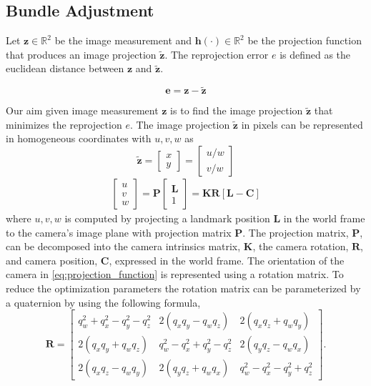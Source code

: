 \documentclass{article}
\renewcommand{\Vec}[1]{{\mathbf{#1}}}
\newcommand{\Mat}[1]{{\mathbf{#1}}}
\newcommand{\re}{{\mathbb{R}}}
\newcommand{\error}{{\Vec{e}}}
\newcommand{\camRot}{{\Vec{R}}}
\newcommand{\camPos}{{\Vec{C}}}
\newcommand{\landmarkPos}{{\Vec{L}}}
\newcommand{\projFunc}{{\Vec{h}}}
\newcommand{\measurement}{{\Vec{z}}}
\newcommand{\estimate}{{\tilde{\Vec{z}}}}
\begin{document}
\subsection{Bundle Adjustment}
Let $\measurement \in \re^{2}$ be the image measurement and $\projFunc(\cdot)
\in \re^{2}$ be the projection function that produces an image projection
$\estimate$. The reprojection error $e$ is defined as the euclidean distance
between $\measurement$ and $\estimate$.

\begin{equation}
  \error = \measurement - \estimate
\end{equation}

Our aim given image measurement $\measurement$ is to find the image projection
$\estimate$ that minimizes the reprojection $e$. The image projection
$\estimate$ in pixels can be represented in homogeneous coordinates with
$u, v, w$ as
%
\begin{equation}
  \estimate
  = \begin{bmatrix} x \\ y \end{bmatrix}
  = \begin{bmatrix} u / w \\ v / w \end{bmatrix}
\end{equation}
%
\begin{align}
  \label{eq:projection_function}
  \begin{bmatrix} u \\ v \\ w \end{bmatrix}
  = \Mat{P} \begin{bmatrix} \landmarkPos \\ 1 \end{bmatrix}
  = \Mat{K} \camRot [\landmarkPos - \camPos]
\end{align}
%
where $u, v, w$ is computed by projecting a landmark position
$\landmarkPos$ in the world frame to the camera's image plane with
projection matrix $\Mat{P}$. The projection matrix, $\Mat{P}$, can be
decomposed into the camera intrinsics matrix, $\Mat{K}$, the camera rotation,
$\camRot$, and camera position, $\camPos$, expressed in the world frame.
%
The orientation of the camera in \eqref{eq:projection_function} is
represented using a rotation matrix. To reduce the optimization parameters
the rotation matrix can be parameterized by a quaternion by using the following
formula,
%
\begin{equation}
  \camRot = \begin{bmatrix}
    q_{w}^{2} + q_{x}^{2} - q_{y}^{2} - q_{z}^{2}
    & 2 (q_{x} q_{y} - q_{w} q_{z})
    & 2 (q_{x} q_{z} + q_{w} q_{y}) \\
    2 (q_{x} q_{y} + q_{w} q_{z})
    & q_{w}^{2} - q_{x}^{2} + q_{y}^{2} - q_{z}^{2}
    & 2 (q_{y} q_{z} - q_{w} q_{x}) \\
    2 (q_{x} q_{z} - q_{w} q_{y})
    & 2 (q_{y} q_{z} + q_{w} q_{x})
    & q_{w}^{2} - q_{x}^{2} - q_{y}^{2} + q_{z}^{2}
  \end{bmatrix}.
\end{equation}
\end{document}
